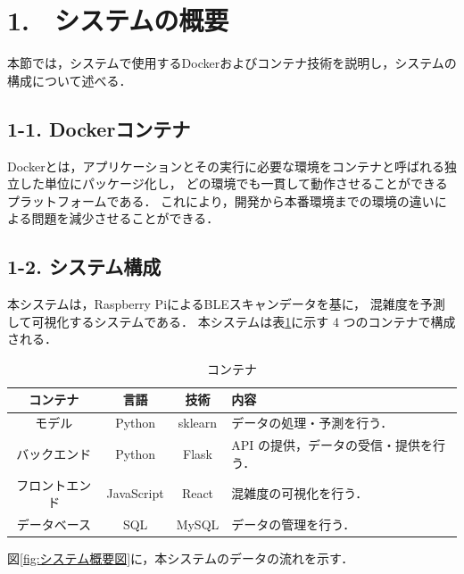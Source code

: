 \section*{1.　システムの概要}


本節では，システムで使用するDockerおよびコンテナ技術を説明し，システムの構成について述べる．


\subsection*{1-1. Dockerコンテナ}

Dockerとは，アプリケーションとその実行に必要な環境をコンテナと呼ばれる独立した単位にパッケージ化し，
どの環境でも一貫して動作させることができるプラットフォームである．
これにより，開発から本番環境までの環境の違いによる問題を減少させることができる．

\subsection*{1-2. システム構成}

本システムは，Raspberry PiによるBLEスキャンデータを基に，
混雑度を予測して可視化するシステムである．
本システムは表\ref{tbl:コンテナ}に示す 4 つのコンテナで構成される．

\begin{table}[tb]
	\centering
	\caption{コンテナ}
	\label{tbl:コンテナ}
	\small
	\doublerulesep=0.3pt
	\begin{tabular}{cccl} \hline\hline\hline
		コンテナ & 言語 & 技術 & 内容 \\ \hline
		モデル & Python & sklearn &  データの処理・予測を行う． \\
		バックエンド & Python & Flask & API の提供，データの受信・提供を行う． \\
		フロントエンド & JavaScript & React & 混雑度の可視化を行う． \\
		データベース & SQL & MySQL & データの管理を行う． \\  \hline
	\end{tabular}
\end{table}

図\ref{fig:システム概要図}に，本システムのデータの流れを示す．

